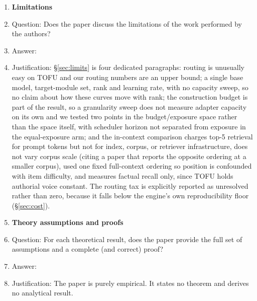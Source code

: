 \begin{enumerate}
\item {\bf Limitations}
    \item[] Question: Does the paper discuss the limitations of the work
    performed by the authors?
    \item[] Answer: \answerYes{}
    \item[] Justification: \S\ref{sec:limits} is four dedicated paragraphs:
    routing is unusually easy on TOFU and our routing numbers are an upper
    bound; a single base model, target-module set, rank and learning rate, with
    no capacity sweep, so no claim about how these curves move with rank; the
    construction budget is part of the result, so a granularity sweep does not
    measure adapter capacity on its own and we tested two points in the
    budget/exposure space rather than the space itself, with scheduler horizon
    not separated from exposure in the equal-exposure arm; and the in-context
    comparison charges top-5 retrieval for prompt tokens but not for index,
    corpus, or retriever infrastructure, does not vary corpus scale (citing a
    paper that reports the opposite ordering at a smaller corpus), used one
    fixed full-context ordering so position is confounded with item difficulty,
    and measures factual recall only, since TOFU holds authorial voice constant.
    The routing tax is explicitly reported as unresolved rather than zero,
    because it falls below the engine's own reproducibility floor
    (\S\ref{sec:cost}).

\item {\bf Theory assumptions and proofs}
    \item[] Question: For each theoretical result, does the paper provide the
    full set of assumptions and a complete (and correct) proof?
    \item[] Answer: \answerNA{}
    \item[] Justification: The paper is purely empirical. It states no theorem
    and derives no analytical result.


\end{enumerate}
